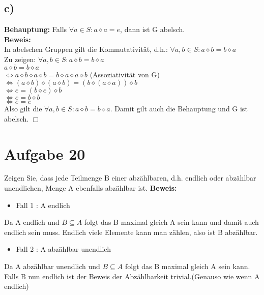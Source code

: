 \documentclass[paper = a4, ngerman]{scrartcl}
\begin{document}
	\subsection*{c)}
	\textbf{Behauptung:} Falls $\forall a \in S: a \diamond a = e $, dann ist G abelsch.\\
	
	\textbf{Beweis:}\\
	In abelschen Gruppen gilt die Kommutativität, d.h.: $\forall a, b \in S: a \diamond b = b \diamond a$\\
	
	Zu zeigen: $\forall a, b \in S: a \diamond b = b \diamond a$\\
	
	$a \diamond b = b \diamond a$\\
	$\Leftrightarrow a \diamond b \diamond a \diamond b = b \diamond a\diamond a \diamond b$ \hspace{10mm}(Assoziativität von G)\\
	$\Leftrightarrow (a \diamond b) \diamond (a \diamond b) = (b \diamond (a\diamond a)) \diamond b$  \\
	$\Leftrightarrow e = (b \diamond e) \diamond b$  \\
	$\Leftrightarrow e = b \diamond b$  \\
	$\Leftrightarrow e = e$\\
	
	Also gilt die $\forall a, b \in S: a \diamond b = b \diamond a$. Damit gilt auch die Behauptung und G ist abelsch.
		\hfill$\Box$\\
	
	\section*{Aufgabe 20}
Zeigen Sie, dass jede Teilmenge B einer abzählbaren, d.h. endlich oder abzählbar unendlichen, Menge A ebenfalls abzählbar ist.
\textbf{Beweis:}
\begin{itemize}
	\item Fall 1 : A endlich
\end{itemize}
Da A endlich und $B \subseteq A$  folgt das B maximal gleich A sein kann und damit auch endlich sein muss. Endlich viele Elemente kann man zählen, also ist B abzählbar.
\begin{itemize}
	\item Fall 2 : A abzählbar unendlich
\end{itemize}
Da A abzählbar unendlich und $B \subseteq A$  folgt das B maximal gleich A sein kann.\\
Falls B nun endlich ist der Beweis der Abzählbarkeit trivial.(Genauso wie wenn A endlich)\\
\end{document}
